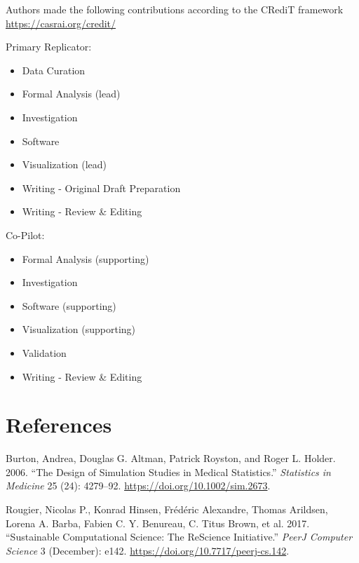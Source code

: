 \documentclass[10,a4paperpaper,]{article}
\newenvironment{CSLReferences}%
  {}%
  {\par}
\begin{document}
Authors made the following contributions according to the CRediT
framework \url{https://casrai.org/credit/}

Primary Replicator:

\begin{itemize}
\tightlist
\item
  Data Curation\\
\item
  Formal Analysis (lead)\\
\item
  Investigation\\
\item
  Software\\
\item
  Visualization (lead)\\
\item
  Writing - Original Draft Preparation\\
\item
  Writing - Review \& Editing
\end{itemize}

Co-Pilot:

\begin{itemize}
\tightlist
\item
  Formal Analysis (supporting)\\
\item
  Investigation\\
\item
  Software (supporting)\\
\item
  Visualization (supporting)\\
\item
  Validation\\
\item
  Writing - Review \& Editing
\end{itemize}

\newpage

\section*{References}
\begingroup
\hphantom{x}
\setlength{\parindent}{-0.5in}
\setlength{\leftskip}{0.5in}

\hypertarget{refs}{}
\begin{CSLReferences}{1}{0}
\leavevmode{}%
Burton, Andrea, Douglas G. Altman, Patrick Royston, and Roger L. Holder.
2006. {``The Design of Simulation Studies in Medical Statistics.''}
\emph{Statistics in Medicine} 25 (24): 4279--92.
\url{https://doi.org/10.1002/sim.2673}.

\leavevmode{}%
Rougier, Nicolas P., Konrad Hinsen, Frédéric Alexandre, Thomas Arildsen,
Lorena A. Barba, Fabien C. Y. Benureau, C. Titus Brown, et al. 2017.
{``Sustainable Computational Science: The {ReScience} Initiative.''}
\emph{PeerJ Computer Science} 3 (December): e142.
\url{https://doi.org/10.7717/peerj-cs.142}.

\end{CSLReferences}
\end{document}
